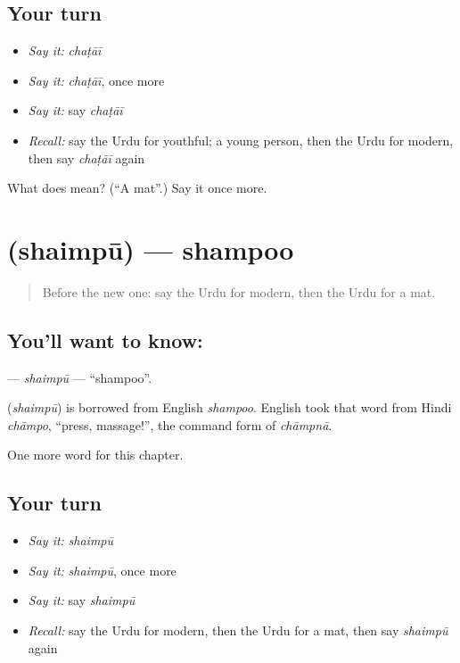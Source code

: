 \subsection*{Your turn}
\begin{itemize}
\raggedright
  \item \emph{Say it:} \emph{chaṭāī}
  \item \emph{Say it:} \emph{chaṭāī}, once more
  \item \emph{Say it:} say \emph{chaṭāī}
  \item \emph{Recall:} say the Urdu for youthful; a young person, then the Urdu for modern, then say \emph{chaṭāī} again
\end{itemize}

\begin{tcolorbox}[breakable,colback=teal!4,colframe=teal!35!black,title={Before you move on}]
What does  mean? (\textquotedblleft{}A mat\textquotedblright{}.) Say it once more.
\end{tcolorbox}
\section[\texorpdfstring{\ur{شیمپو} (shaimpū)}{شیمپو (shaimpū)}]{ (shaimpū) — shampoo}

\label{lesson:UR-C197-shaimpu}



\begin{quote}
Before the new one: say the Urdu for modern, then the Urdu for a mat.
\end{quote}

\subsection*{You'll want to know: }
\textbf{} — \emph{shaimpū} — \textquotedblleft{}shampoo\textquotedblright{}.

\begin{cousinweb}
\textbf{} (\emph{shaimpū}) is borrowed from English \emph{shampoo}. English took that word from Hindi \emph{chāmpo}, \textquotedblleft{}press, massage!\textquotedblright{}, the command form of \emph{chāmpnā}.
\end{cousinweb}

\begin{grammarlens}[title={What you've built}]
One more word for this chapter.
\end{grammarlens}

\subsection*{Your turn}
\begin{itemize}
\raggedright
  \item \emph{Say it:} \emph{shaimpū}
  \item \emph{Say it:} \emph{shaimpū}, once more
  \item \emph{Say it:} say \emph{shaimpū}
  \item \emph{Recall:} say the Urdu for modern, then the Urdu for a mat, then say \emph{shaimpū} again
\end{itemize}

